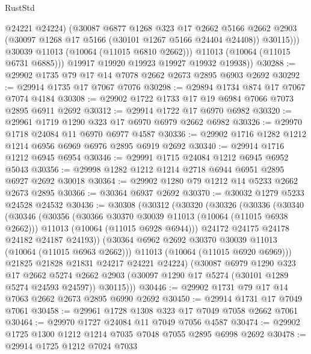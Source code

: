 \begin{lexlean}{RustStd}
\begin{coremodule}
                  @24221
                  @24224)
                (@30087
                  @6877
                  @1268
                  @323
                  @17
                  @2662
                  @5166
                  @2662
                  @2903
                  (@30097 @1268 @17 @5166 (@30101 @1267 @5166 @24404 @24408))
                  @30115)))
            @30039
            @11013
            (@10064 (@11015 @6810 @2662)))
          @11013
          (@10064 (@11015 @6731 @6885)))
        @19917
        @19920
        @19923
        @19927
        @19932
        @19938))
@30288 := @29902 @1735 @79 @17 @14 @7078 @2662 @2673 @2895 @6903 @2692
@30292 := @29914 @1735 @17 @7067 @7076
@30298 := @29894 @1734 @874 @17 @7067 @7074 @4184
@30308 := @29902 @1722 @1733 @17 @19 @6984 @7066 @7073 @2895 @6911 @2692
@30312 := @29914 @1722 @17 @6970 @6982
@30320 := @29961 @1719 @1290 @323 @17 @6970 @6979 @2662 @6982
@30326 := @29970 @1718 @24084 @11 @6970 @6977 @4587
@30336 := @29902 @1716 @1282 @1212 @1214 @6956 @6969 @6976 @2895 @6919 @2692
@30340 := @29914 @1716 @1212 @6945 @6954
@30346 := @29991 @1715 @24084 @1212 @6945 @6952 @5043
@30356 := @29998 @1282 @1212 @1214 @2718 @6944 @6951 @2895 @6927 @2692 @30018
@30364 := @29902 @1280 @79 @1212 @14 @5233 @2662 @2673 @2895
@30366 := @30364 @6937 @2692
@30370 := @30032 @1279 @5233 @24528 @24532
@30436 := @30308
    (@30312
      (@30320
        (@30326
          (@30336
            (@30340
              (@30346
                (@30356
                  (@30366 @30370 @30039 @11013 (@10064 (@11015 @6938 @2662)))
                  @11013
                  (@10064 (@11015 @6928 @6944)))
                @24172
                @24175
                @24178
                @24182
                @24187
                @24193))
            (@30364 @6962 @2692 @30370 @30039 @11013 (@10064 (@11015 @6963 @2662)))
            @11013
            (@10064 (@11015 @6920 @6969)))
          @21825
          @21828
          @21831
          @24217
          @24221
          @24224)
        (@30087
          @6979
          @1290
          @323
          @17
          @2662
          @5274
          @2662
          @2903
          (@30097 @1290 @17 @5274 (@30101 @1289 @5274 @24593 @24597))
          @30115)))
@30446 := @29902 @1731 @79 @17 @14 @7063 @2662 @2673 @2895 @6990 @2692
@30450 := @29914 @1731 @17 @7049 @7061
@30458 := @29961 @1728 @1308 @323 @17 @7049 @7058 @2662 @7061
@30464 := @29970 @1727 @24084 @11 @7049 @7056 @4587
@30474 := @29902 @1725 @1300 @1212 @1214 @7035 @7048 @7055 @2895 @6998 @2692
@30478 := @29914 @1725 @1212 @7024 @7033

\end{coremodule}
\end{lexlean}

